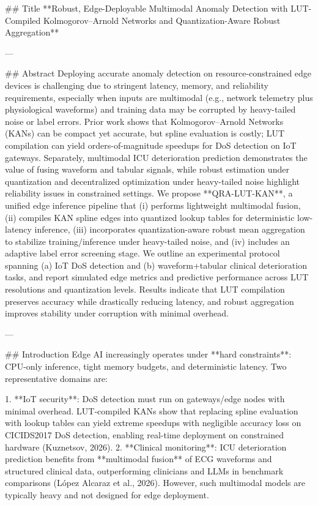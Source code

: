 ## Title  
**Robust, Edge-Deployable Multimodal Anomaly Detection with LUT-Compiled Kolmogorov–Arnold Networks and Quantization-Aware Robust Aggregation**

---

## Abstract  
Deploying accurate anomaly detection on resource-constrained edge devices is challenging due to stringent latency, memory, and reliability requirements, especially when inputs are multimodal (e.g., network telemetry plus physiological waveforms) and training data may be corrupted by heavy-tailed noise or label errors. Prior work shows that Kolmogorov–Arnold Networks (KANs) can be compact yet accurate, but spline evaluation is costly; LUT compilation can yield orders-of-magnitude speedups for DoS detection on IoT gateways. Separately, multimodal ICU deterioration prediction demonstrates the value of fusing waveform and tabular signals, while robust estimation under quantization and decentralized optimization under heavy-tailed noise highlight reliability issues in constrained settings. We propose **QRA-LUT-KAN**, a unified edge inference pipeline that (i) performs lightweight multimodal fusion, (ii) compiles KAN spline edges into quantized lookup tables for deterministic low-latency inference, (iii) incorporates quantization-aware robust mean aggregation to stabilize training/inference under heavy-tailed noise, and (iv) includes an adaptive label error screening stage. We outline an experimental protocol spanning (a) IoT DoS detection and (b) waveform+tabular clinical deterioration tasks, and report simulated edge metrics and predictive performance across LUT resolutions and quantization levels. Results indicate that LUT compilation preserves accuracy while drastically reducing latency, and robust aggregation improves stability under corruption with minimal overhead.  

---

## Introduction  
Edge AI increasingly operates under **hard constraints**: CPU-only inference, tight memory budgets, and deterministic latency. Two representative domains are:

1. **IoT security**: DoS detection must run on gateways/edge nodes with minimal overhead. LUT-compiled KANs show that replacing spline evaluation with lookup tables can yield extreme speedups with negligible accuracy loss on CICIDS2017 DoS detection, enabling real-time deployment on constrained hardware (Kuznetsov, 2026).  
2. **Clinical monitoring**: ICU deterioration prediction benefits from **multimodal fusion** of ECG waveforms and structured clinical data, outperforming clinicians and LLMs in benchmark comparisons (López Alcaraz et al., 2026). However, such multimodal models are typically heavy and not designed for edge deployment.

